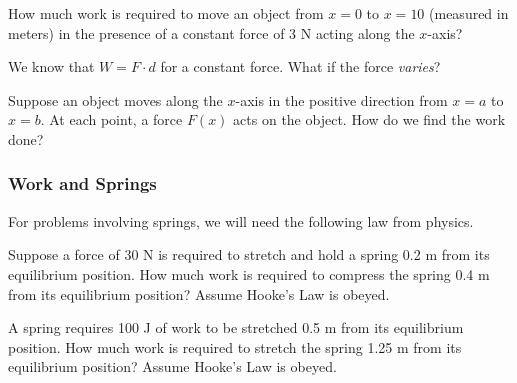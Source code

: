 \documentclass[12pt]{article}
\begin{document}
\Example How much work is required to move an object from $x=0$ to $x=10$ (measured in meters) in the presence of a constant force of 3 N acting along the $x$-axis?

\vspace{40mm}

We know that $W=F\cdot d$ for a constant force. What if the force \textit{varies}?

\vspace{3mm}

Suppose an object moves along the $x$-axis in the positive direction from $x=a$ to $x=b$. At each point, a force $F(x)$ acts on the object. How do we find the work done?

\vfill


\newpage

\subsubsection*{Work and Springs}

For problems involving springs, we will need the following law from physics.\\


\Example Suppose a force of 30 N is required to stretch and hold a spring 0.2 m from its equilibrium position. How much work is required to compress the spring 0.4 m from its equilibrium position? Assume Hooke's Law is obeyed.

\newpage

\Example A spring requires 100 J of work to be stretched 0.5 m from its equilibrium position. How much work is required to stretch the spring 1.25 m from its equilibrium position? Assume Hooke's Law is obeyed.

\vspace{100mm}
\end{document}

